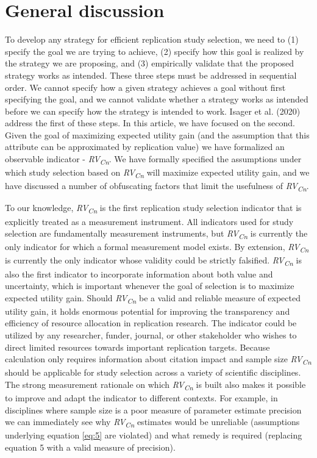 \documentclass[
  english,
  man,floatsintext]{apa6}
\begin{document}
\hypertarget{general-discussion}{%
\section{General discussion}\label{general-discussion}}

To develop any strategy for efficient replication study selection, we need to (1) specify the goal we are trying to achieve, (2) specify how this goal is realized by the strategy we are proposing, and (3) empirically validate that the proposed strategy works as intended. These three steps must be addressed in sequential order. We cannot specify how a given strategy achieves a goal without first specifying the goal, and we cannot validate whether a strategy works as intended before we can specify how the strategy is intended to work. Isager et al. (2020) address the first of these steps. In this article, we have focused on the second. Given the goal of maximizing expected utility gain (and the assumption that this attribute can be approximated by replication value) we have formalized an observable indicator - \emph{RV\textsubscript{Cn}}. We have formally specified the assumptions under which study selection based on \emph{RV\textsubscript{Cn}} will maximize expected utility gain, and we have discussed a number of obfuscating factors that limit the usefulness of \emph{RV\textsubscript{Cn}}.

To our knowledge, \emph{RV\textsubscript{Cn}} is the first replication study selection indicator that is explicitly treated as a measurement instrument. All indicators used for study selection are fundamentally measurement instruments, but \emph{RV\textsubscript{Cn}} is currently the only indicator for which a formal measurement model exists. By extension, \emph{RV\textsubscript{Cn}} is currently the only indicator whose validity could be strictly falsified. \emph{RV\textsubscript{Cn}} is also the first indicator to incorporate information about both value and uncertainty, which is important whenever the goal of selection is to maximize expected utility gain. Should \emph{RV\textsubscript{Cn}} be a valid and reliable measure of expected utility gain, it holds enormous potential for improving the transparency and efficiency of resource allocation in replication research. The indicator could be utilized by any researcher, funder, journal, or other stakeholder who wishes to direct limited resources towards important replication targets. Because calculation only requires information about citation impact and sample size \emph{RV\textsubscript{Cn}} should be applicable for study selection across a variety of scientific disciplines. The strong measurement rationale on which \emph{RV\textsubscript{Cn}} is built also makes it possible to improve and adapt the indicator to different contexts. For example, in disciplines where sample size is a poor measure of parameter estimate precision we can immediately see why \emph{RV\textsubscript{Cn}} estimates would be unreliable (assumptions underlying equation \eqref{eq:5} are violated) and what remedy is required (replacing equation 5 with a valid measure of precision).
\end{document}
